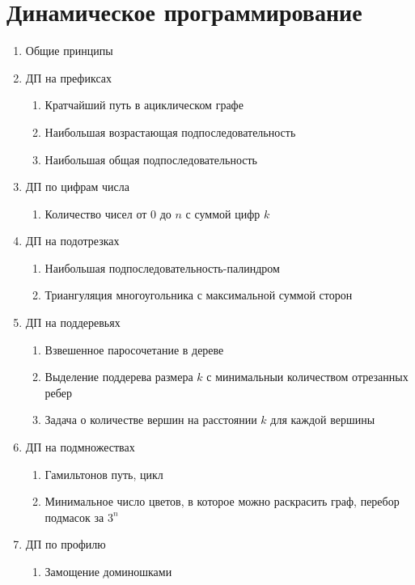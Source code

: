 \documentclass[a4paper,12pt]{article}
\begin{document}
  \section{Динамическое программирование}
    \begin{enumerate}
      \item Общие принципы
      \item ДП на префиксах
        \begin{enumerate}
          \item Кратчайший путь в ациклическом графе
          \item Наибольшая возрастающая подпоследовательность
          \item Наибольшая общая подпоследовательность
        \end{enumerate}
      \item ДП по цифрам числа
        \begin{enumerate}
          \item Количество чисел от $0$ до $n$ с суммой цифр $k$
        \end{enumerate}
      \item ДП на подотрезках
        \begin{enumerate}
          \item Наибольшая подпоследовательность-палиндром
          \item Триангуляция многоугольника с максимальной суммой сторон
        \end{enumerate}
      \item ДП на поддеревьях
        \begin{enumerate}
          \item Взвешенное паросочетание в дереве
          \item Выделение поддерева размера $k$ с минимальныи количеством отрезанных ребер
          \item Задача о количестве вершин на расстоянии $k$ для каждой вершины
        \end{enumerate}
      \item ДП на подмножествах
        \begin{enumerate}
          \item Гамильтонов путь, цикл
          \item Минимальное число цветов, в которое можно раскрасить граф, перебор подмасок за $3^n$
        \end{enumerate}
      \item ДП по профилю
        \begin{enumerate}
          \item Замощение доминошками
        \end{enumerate}
    \end{enumerate}
\end{document}
